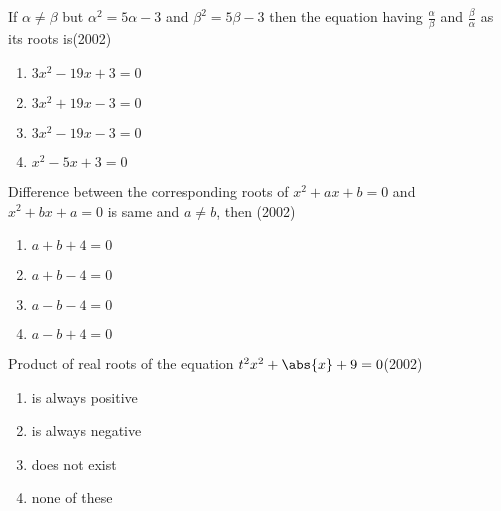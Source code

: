 \iffalse
  \title{Assignment}
  \author{AI24BTECH11022 - Pabbuleti Venkata Charan Teja}
  \section{mains}
\fi

\item 
If $\alpha\neq\beta$ but ${\alpha^{2}=5\alpha-3}$ and ${\beta^{2}=5\beta-3}$ then the equation having $\frac{\alpha}{\beta}$ and $\frac{\beta}{\alpha}$ as its roots is\hfill(2002)

\begin{multicols}{2}

\begin{enumerate}

\item$3x^{2}-19x+3=0$

\item$3x^{2}+19x-3=0$

\item $3x^{2}-19x-3=0$

\item $x^{2}-5x+3=0$

\end{enumerate}

\end{multicols}

\item 
Difference between the corresponding roots of ${x^{2}+ax+b=0}$ and ${x^{2}+bx+a=0}$ is same and $a\not=b$, then \hfill(2002)
\begin{multicols}{2}
    
\begin{enumerate}

\item $a+b+4=0$

\item $a+b-4=0$

\item $a-b-4=0$

\item $a-b+4=0$
\end{enumerate}
\end{multicols}

\item 
Product of real roots of the equation ${t^{2}x^{2}+\abs{x}+9=0}$\hfill(2002)
\begin{multicols}{2}
\begin{enumerate}

\item is always positive

\item is always negative

\item does not exist

\item none of these
\end{enumerate}
\end{multicols}

